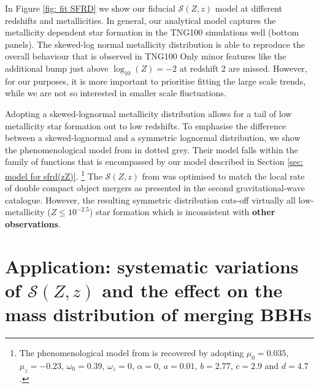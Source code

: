 \documentclass[twocolumn]{aastex631}
\newcommand{\SFRDzZ}{\ensuremath{\mathcal{S}(Z,z)}\xspace}
\newcommand{\todo}[1]{{\color{purple}\bf{#1}}}
\begin{document}
In Figure \ref{fig: fit SFRD} we show our fiducial \SFRDzZ model at different redshifts and metallicities.
In general, our analytical model captures the metallicity dependent star formation in the TNG100 simulations well (bottom panels). 
The skewed-log normal metallicity distribution is able to reproduce the overall behaviour that is observed in TNG100 \citep[bottom left panel, but cf. ][for an in-depth discussion of low metallicity star formation in the TNG50 simulation]{Pakmor+2022}
Only minor features like the additional bump just above $\log_{10}(Z) = -2$ at redshift 2 are missed. 
However, for our purposes, it is more important to prioritise fitting the large scale trends, while we are not so interested in smaller scale fluctuations.

Adopting a skewed-lognormal metallicity distribution allows for a tail of low metallicity star formation out to low redshifts. To emphasise the difference between a skewed-lognormal and a symmetric lognormal distribution, we show the phenomenological model from \cite{Neijssel+2019} in dotted grey. Their model falls within the family of functions that is encompassed by our model described in Section \ref{sec: model for sfrd(zZ)}. \footnote{The phenomenological model from \cite{Neijssel+2019} is recovered by adopting $\mu_0= 0.035$, $\mu_z=-0.23$, $\omega_0=0.39 $, $\omega_z = 0$, $\alpha = 0$, $a=0.01$, $b=2.77$, $c=2.9$ and $d=4.7$. }
The \SFRDzZ from \cite{Neijssel+2019} was optimised to match the local rate of double compact object mergers as presented in the second gravitational-wave catalogue. However, the resulting symmetric distribution cuts-off virtually all low-metallicity ($Z\leq 10^{-2.5}$) star formation which is inconsistent with \todo{other observations}.




\section{Application: systematic variations of \SFRDzZ and the effect on the mass distribution of merging BBHs \label{sec: mass dists}}
\end{document}
